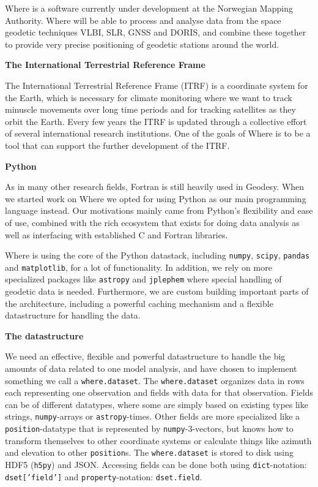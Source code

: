 Where is a software currently under development at the Norwegian Mapping
Authority. Where will be able to process and analyse data from the space
geodetic techniques VLBI, SLR, GNSS and DORIS, and combine these together to
provide very precise positioning of geodetic stations around the world.

{\bfseries The International Terrestrial Reference Frame}

The International Terrestrial Reference Frame (ITRF) is a coordinate system for
the Earth, which is necessary for climate monitoring where we want to track
minuscle movements over long time periods and for tracking satellites as they
orbit the Earth. Every few years the ITRF is updated through a collective effort
of several international research institutions. One of the goals of Where is to
be a tool that can support the further development of the ITRF.

{\bfseries Python}

As in many other research fields, Fortran is still heavily used in Geodesy. When
we started work on Where we opted for using Python as our main programming
language instead. Our motivations mainly came from Python's flexibility and ease
of use, combined with the rich ecosystem that exists for doing data analysis as
well as interfacing with established C and Fortran libraries.

Where is using the core of the Python datastack, including \texttt{numpy},
\texttt{scipy}, \texttt{pandas} and \texttt{matplotlib}, for a lot of
functionality. In addition, we rely on more specialized packages like
\texttt{astropy} and \texttt{jplephem} where special handling of geodetic data
is needed. Furthermore, we are custom building important parts of the
architecture, including a powerful caching mechanism and a flexible
datastructure for handling the data.

{\bfseries The datastructure}

We need an effective, flexible and powerful datastructure to handle the big
amounts of data related to one model analysis, and have chosen to implement
something we call a \texttt{where.dataset}. The \texttt{where.dataset} organizes
data in rows each representing one observation and fields with data for that
observation. Fields can be of different datatypes, where some are simply based
on existing types like strings, \texttt{numpy}-arrays or
\texttt{astropy}-times. Other fields are more specialized like a
\texttt{position}-datatype that is represented by \texttt{numpy}-3-vectors, but
knows how to transform themselves to other coordinate systems or calculate
things like azimuth and elevation to other \texttt{position}s. The
\texttt{where.dataset} is stored to disk using HDF5 (\texttt{h5py}) and JSON.
Accessing fields can be done both
using \texttt{dict}-notation: \texttt{dset['field']}
and \texttt{property}-notation: \texttt{dset.field}.

\endinput
